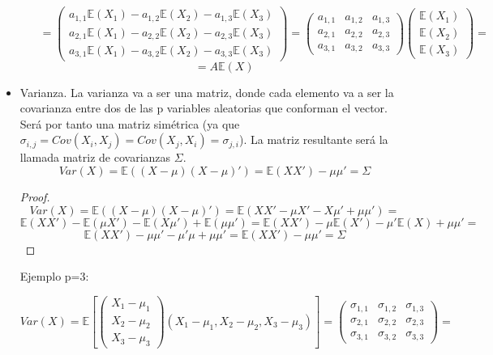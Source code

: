 \documentclass[nochap]{apuntes}
\begin{document}
\begin{itemize}
\begin{enumerate}
\[
=\left(
\begin{array}{c}
a_{1,1}\mathbb{E}(X_1) - a_{1,2}\mathbb{E}(X_2) - a_{1,3}\mathbb{E}(X_3)\\
a_{2,1}\mathbb{E}(X_1) - a_{2,2}\mathbb{E}(X_2) - a_{2,3}\mathbb{E}(X_3)\\
a_{3,1}\mathbb{E}(X_1) - a_{3,2}\mathbb{E}(X_2) - a_{3,3}\mathbb{E}(X_3)
\end{array}
\right)=
\left(
\begin{array}{ccc}
a_{1,1}& a_{1,2}& a_{1,3}\\
a_{2,1}& a_{2,2}& a_{2,3}\\
a_{3,1}& a_{3,2}& a_{3,3}
\end{array}
\right)
\left(
\begin{array}{c}
\mathbb{E}(X_1)\\
\mathbb{E}(X_2)\\
\mathbb{E}(X_3)
\end{array}
\right)=
\]
\[
=A\mathbb{E}(X)
\]

\end{enumerate}

\item Varianza. La varianza va a ser una matriz, donde cada elemento va a ser la covarianza entre dos de las p variables aleatorias que conforman el vector. Será por tanto una matriz simétrica (ya que $\sigma_{i,j}=Cov(X_i,X_j)=Cov(X_j,X_i)=\sigma_{j,i}$). La matriz resultante será la llamada matriz de covarianzas $\Sigma$.
\[
Var(X)=\mathbb{E}\left((X-\mu)(X-\mu)'\right) = \mathbb{E}(XX')-\mu \mu'=\Sigma
\]

\begin{proof}
\[
Var(X)=\mathbb{E}\left((X-\mu)(X-\mu)'\right) = \mathbb{E}(XX'- \mu X' - X \mu'+\mu \mu')=
\]
\[
\mathbb{E}(XX')-\mathbb{E}(\mu X')-\mathbb{E}(X\mu')+\mathbb{E}(\mu \mu')= \mathbb{E}(XX')-\mu \mathbb{E}(X')-\mu' \mathbb{E}(X)+\mu\mu'=
\]
\[
 \mathbb{E}(XX')-\mu \mu'-\mu' \mu+\mu \mu' = \mathbb{E}(XX')-\mu \mu'=\Sigma
\]
\end{proof}

Ejemplo p=3:

\[
Var(X)=
\mathbb{E}\left[
\left(
\begin{array}{c}
X_1-\mu_1\\
X_2-\mu_2\\
X_3-\mu_3
\end{array}
\right)
(X_1-\mu_1, X_2-\mu_2, X_3-\mu_3)\right]=
\left(
\begin{array}{ccc}
\sigma_{1,1}& \sigma_{1,2}& \sigma_{1,3} \\
\sigma_{2,1}& \sigma_{2,2}& \sigma_{2,3} \\
\sigma_{3,1}& \sigma_{3,2}& \sigma_{3,3}
\end{array}
\right)=
\]


\end{itemize}
\end{document}
